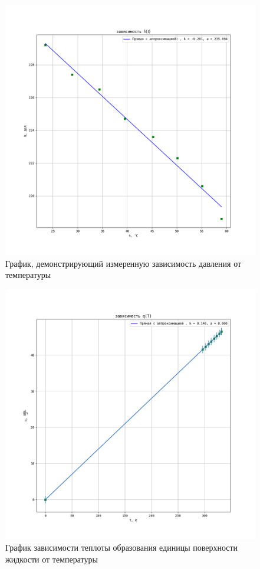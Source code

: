 \documentclass[a4paper, 12pt]{article}
\begin{document}
\newpage

\begin{figure} [H]
	\centering 
	\includegraphics[scale=0.55]{img/h(t).png} 
	\caption{График, демонстрирующий измеренную зависимость давления от температуры} 
\end{figure}

\newpage

\begin{figure}[h!]
	\centering 
	\includegraphics[scale=0.57]{img/q(t).png} 
	\caption{График зависимости теплоты образования единицы поверхности жидкости от температуры} 
\end{figure}
\end{document}
